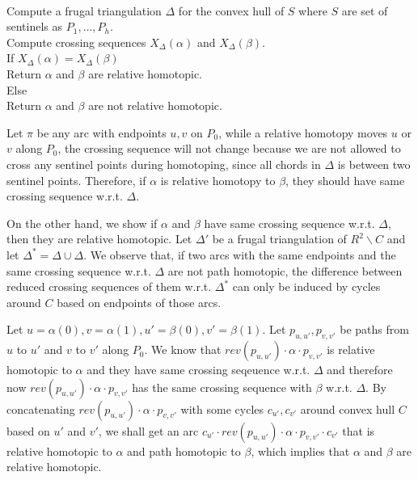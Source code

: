 \documentclass[11pt]{article}
\begin{document}
\begin{solution}
  \begin{algo}
    \+
    \\  Compute a frugal triangulation \(\Delta\) for the convex hull of \(S\) where \(S\) are set of sentinels as \(P_1,\dots,P_h\).
    \\  Compute crossing sequences \(X_\Delta(\alpha)\) and \(X_\Delta(\beta)\).
    \\  If  \(X_\Delta(\alpha)= X_\Delta(\beta)\)\+
    \\      Return \(\alpha\) and \(\beta\) are relative homotopic.\-
    \\  Else\+
    \\      Return \(\alpha\) and \(\beta\) are not relative homotopic.\-
  \end{algo}

  Let \(\pi\) be any arc with endpoints \(u,v\) on \(P_0\), while a relative homotopy moves \(u\) or \(v\) along \(P_0\), the crossing sequence will not change because we are not allowed to cross any sentinel points during homotoping, since all chords in \(\Delta\) is between two sentinel points. Therefore, if \(\alpha\) is relative homotopy to \(\beta\), they should have same crossing sequence w.r.t. \(\Delta\).

  On the other hand, we show if \(\alpha\) and \(\beta\) have same crossing sequence w.r.t. \(\Delta\), then they are relative homotopic. Let \(\Delta'\) be a frugal triangulation of \(R^2\backslash C\) and let \(\Delta^*=\Delta\cup \Delta\). We observe that, if two arcs with the same endpoints and the same crossing sequence w.r.t. \(\Delta\) are not path homotopic, the difference between reduced crossing sequences of them w.r.t. \(\Delta^*\) can only be induced by cycles around \(C\) based on endpoints of those arcs.

  Let \(u=\alpha(0), v=\alpha(1), u'=\beta(0), v'=\beta(1)\). Let \(p_{u,u'},p_{v,v'}\) be paths from \(u\) to \(u'\) and \(v\) to \(v'\) along \(P_0\). We know that \(rev(p_{u,u'})\cdot \alpha\cdot p_{v,v'}\) is relative homotopic to \(\alpha\) and they have same crossing seqeuence w.r.t. \(\Delta\) and therefore now \(rev(p_{u,u'})\cdot \alpha\cdot p_{v,v'}\) has the same crossing sequence with \(\beta\) w.r.t. \(\Delta\). By concatenating \(rev(p_{u,u'})\cdot \alpha\cdot p_{v,v'}\) with some cycles \(c_{u'}, c_{v'}\) around convex hull \(C\) based on \(u'\) and \(v'\), we shall get an arc \(c_{u'}\cdot rev(p_{u,u'})\cdot \alpha\cdot p_{v,v'}\cdot c_{v'}\) that is relative homotopic to \(\alpha\) and path homotopic to \(\beta\), which implies that \(\alpha\) and \(\beta\) are relative homotopic.

\end{solution}
\end{document}
